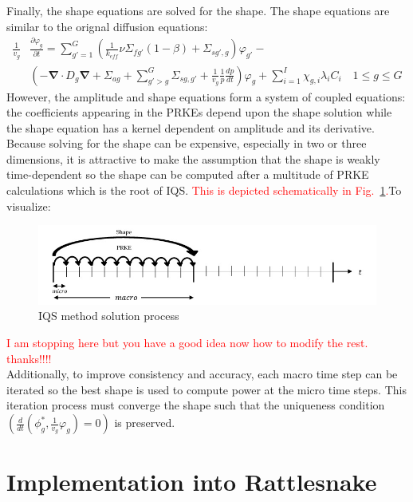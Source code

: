 \documentclass[11pt]{scrartcl}
\renewcommand{\div}{\bs{\nabla}\! \cdot \!}
\newcommand{\grad}{\bs{\nabla}}
\newcommand{\fig}[1]{Fig.~\ref{#1}}                      %
\newcommand{\bs}[1]{\mathbf{#1}}
\newcommand{\tcr}[1]{\textcolor{red}{#1}}
\begin{document}
Finally, the shape equations are solved for the shape. The shape equations are similar to the orignal diffusion equations:
\begin{align}
\frac{1}{v_g}& \frac{\partial \varphi_g }{\partial t} = \sum_{g'=1}^G\left(\frac{1}{k_{eff}}\nu \Sigma_{fg'}(1-\beta)+\Sigma_{sg',g}\right) \varphi_{g'} - \nonumber \\
& \left( -\div D_g \grad  + \Sigma_{ag}  + \sum_{g'>g}^G\Sigma_{sg,g'} + \frac{1}{v_g}\frac{1}{p}\frac{dp}{dt} \right)\varphi_g + \sum_{i=1}^I\chi_{g,i}\lambda_i C_i \quad 1 \le g \le G 
\label{eq:shape}
\end{align}
However, the amplitude and shape equations form a system of coupled equations: the coefficients appearing in the PRKEs depend upon the shape solution while the shape equation has a kernel dependent on amplitude and its derivative.  Because solving for the shape can be expensive, especially in two or three dimensions, it is attractive to make the assumption that the shape is weakly time-dependent so the shape can be computed after a multitude of PRKE calculations which is the root of IQS.  \tcr{This is depicted schematically in \fig{fig:IQS}.}To visualize:
%
\begin{figure}[h]
\includegraphics[width=\linewidth]{IQS_visualization.jpg}
\caption{IQS method solution process}
\label{fig:IQS}
\end{figure}
%
\tcr{I am stopping here but you have a good idea now how to modify the rest. thanks!!!!\\}
Additionally, to improve consistency and accuracy, each macro time step can be iterated so the best shape is used to compute power at the micro time steps.  This iteration process must converge the shape such that the uniqueness condition $(\frac{d}{dt}\left(\phi_g^*,\frac{1}{v_g}\varphi_g\right)=0)$ is preserved.

\newpage

\section{Implementation into Rattlesnake}
\end{document}
